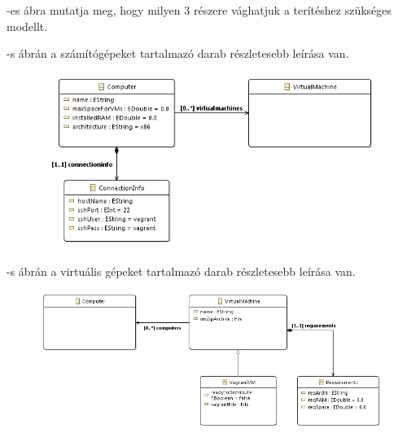 
\Aref{}-es ábra mutatja meg, hogy milyen 3 részere vághatjuk a terítéshez szükséges modellt.


-s ábrán a számítógépeket tartalmazó darab részletesebb leírása van.

\begin{figure}[ht]
	\centering
	\includegraphics[width=110mm, keepaspectratio]{figures/design_computer.png}
	\caption{}
	\label{fig:designcomputers}
\end{figure}

-s ábrán a virtuális gépeket tartalmazó darab részletesebb leírása van.

\begin{figure}[ht]
	\centering
	\includegraphics[width=130mm, keepaspectratio]{figures/design_vm.png}
	\caption{}
	\label{fig:designvm}
\end{figure}


